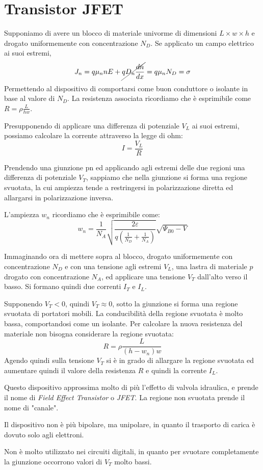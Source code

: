 \documentclass[../template]{subfiles}
\begin{document}
\section{Transistor JFET}
Supponiamo di avere un blocco di materiale univorme di dimensioni $L \times w \times h$ e drogato uniformemente con concentrazione $N_D$.
Se applicato un campo elettrico ai suoi estremi,
\[
    J_n= q \mu_n n E + \cancel{q D_n \frac{dn}{dx}} = q \mu_n N_D = \sigma
\]
Permettendo al dispositivo di comportarsi come buon conduttore o isolante in base al valore di $N_D$.
La resistenza associata ricordiamo che è esprimibile come $R = \rho \frac{L}{h w}$.

Presupponendo di applicare una differenza di potenziale $V_L$ ai suoi estremi, possiamo calcolare la corrente attraverso la legge di ohm:
\[
    I = \frac{V_L}{R}
\]

Prendendo una giunzione pn ed applicando agli estremi delle due regioni una differenza di potenziale $V_T$, sappiamo che nella giunzione si forma una regione svuotata, la cui ampiezza tende a restringersi in polarizzazione diretta ed allargarsi in polarizzazione inversa.

L'ampiezza $w_n$ ricordiamo che è esprimibile come:
\[
    w_n = \frac{1}{N_A} \sqrt{ \frac{2 \varepsilon}{q (\frac{1}{N_D} + \frac{1}{N_A})}}\sqrt{\Psi_{B0} - V}
\]

Immaginando ora di mettere sopra al blocco, drogato uniformemente con concentrazione $N_D$ e con una tensione agli estremi $V_L$, una lastra di materiale $p$ drogato con concentrazione $N_A$, ed applicare una tensione $V_T$ dall'alto verso il basso.
Si formano quindi due correnti $I_T$ e $I_L$.

Supponendo $V_T < 0$, quindi $V_T \approx 0$, sotto la giunzione si forma una regione svuotata di portatori mobili.
La conducibilità della regione svuotata è molto bassa, comportandosi come un isolante. Per calcolare la nuova resistenza del materiale non bisogna considerare la regione svuotata:
\[
    R = \rho \frac{L}{(h - w_n) w}
\]
Agendo quindi sulla tensione $V_T$ si è in grado di allargare la regione svuotata ed aumentare quindi il valore della resistenza $R$ e quindi la corrente $I_L$.

Questo dispositivo approssima molto di più l'effetto di valvola idraulica, e prende il nome di \textit{Field Effect Transistor} o \textit{JFET}.
La regione non svuotata prende il nome di "canale".

Il dispositivo non è più bipolare, ma unipolare, in quanto il trasporto di carica è dovuto solo agli elettroni.

Non è molto utilizzato nei circuiti digitali, in quanto per svuotare completamente la giunzione occorrono valori di $V_T$ molto bassi.
\end{document}
